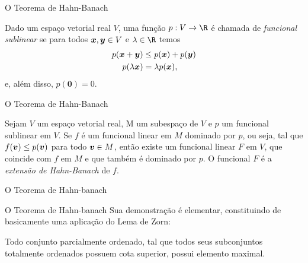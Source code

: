 \documentclass[13pt]{beamer}
\begin{document}

\begin{frame}{O Teorema de Hahn-Banach}
    \begin{defn*}
        Dado um espaço vetorial real \( V \), uma função \( p : V \to \R \) é chamada de \emph{funcional sublinear} se para todos \( \bm{x}, \bm{y} \in V \) e \( \lambda \in \R \) temos
        \begin{align*}
            p ( \bm{x} + \bm{y} ) &\leq p ( \bm{x} ) + p ( \bm{y} ) \\
            p ( \lambda \bm{x} ) &= \lambda p ( \bm{x} )
        ,\end{align*}
        e, além disso, \( p ( \mathbf{0} ) = 0 \).
    \end{defn*}
\end{frame}

\begin{frame}{O Teorema de Hahn-Banach}
    \begin{teo*}
        Sejam \( V \) um espaço vetorial real, M um subespaço de \( V \) e \( p \) um funcional sublinear em \( V \).
        Se \( f \) é um funcional linear em \( M \) dominado por \( p \), ou seja, tal que \( f ( \bm{v} ) \leq p ( \bm{v} ) \) para todo \( \bm{v} \in M \), então existe um funcional linear \( F \) em \( V \), que coincide com \( f \) em \( M \) e que também é dominado por \( p \). O funcional \( F \) é a \emph{extensão de Hahn-Banach} de \( f \).
    \end{teo*}
\end{frame}

\begin{frame}{O Teorema de Hahn-banach}
\end{frame}


\begin{frame}{O Teorema de Hahn-banach}
    Sua demonstração é elementar, constituindo de basicamente uma aplicação do Lema de Zorn:
    \begin{axiom}
        Todo conjunto parcialmente ordenado, tal que todos seus subconjuntos totalmente ordenados possuem cota superior, possui elemento maximal.
    \end{axiom}
\end{frame}
\end{document}

